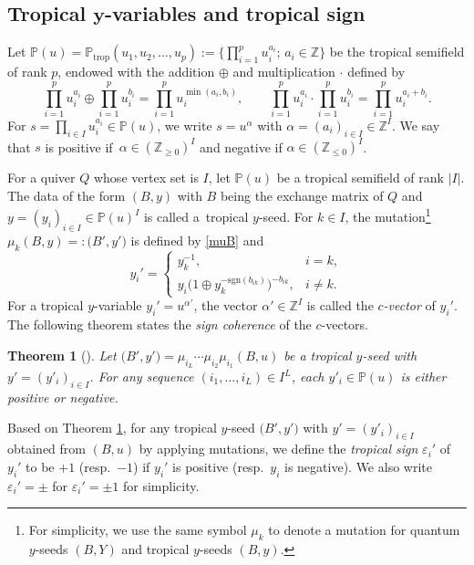 \documentclass[pdftex]{sigma}
\newcommand{\Z}{{\mathbb Z}}
\def\ve{{\varepsilon}}
\newcommand\trop{{\mathrm{trop}}}
\newcommand\bY{Y}
\numberwithin{equation}{section}
\newtheorem{Theorem}{Theorem}[section]
\begin{document}
\subsection[Tropical y-variables and tropical sign]{Tropical $\boldsymbol{y}$-variables and tropical sign}

Let $\mathbb{P}(u)=\mathbb{P}_\trop(u_1,u_2,\dotsc,u_p) := \bigl\{\prod_{i=1}^{p} u_i^{a_i};\, a_i \in \Z \bigr\}$
be the tropical semifield of rank $p$, endowed with the addition $\oplus$ and multiplication $\cdot$ defined by
\[
 \prod_{i=1}^{p} u_i^{a_i} \oplus \prod_{i=1}^{p} u_i^{b_i}
 =
 \prod_{i=1}^{p} u_i^{\min(a_i,b_i)},
 \qquad
 \prod_{i=1}^{p} u_i^{a_i} \cdot \prod_{i=1}^{p} u_i^{b_i}
 =
 \prod_{i=1}^{p} u_i^{a_i+b_i}.
\]
For $s = \prod_{i \in I} u_i^{a_i} \in \mathbb{P}(u)$, we write $s = u^\alpha$
with $\alpha = (a_i)_{i \in I} \in \Z^{I}$.
We say that $s$ is positive if~${\alpha \in (\Z_{\geq 0})^{I}}$ and negative if
$\alpha \in (\Z_{\leq 0})^{I}$.

For a quiver $Q$ whose vertex set is $I$, let $\mathbb{P}(u)$ be a tropical semifield of rank $|I|$.
The data of the form $(B,y)$ with $B$ being the exchange matrix of $Q$ and
$y = (y_i)_{i \in I} \in \mathbb{P}(u)^{I}$ is called a~tropical $y$-seed.
For $k \in I$, the mutation\footnote{For simplicity, we use the same symbol $\mu_k$ to denote a mutation for
quantum $y$-seeds $(B,\bY)$ and tropical $y$-seeds $(B,y)$.}
 $\mu_k (B, y) =: \bigl(B', y'\bigr)$ is defined by
\eqref{muB} and
\begin{equation}\label{tmu}
y_{i}' =
 \begin{cases}
 y_k^{-1}, & i=k,
 \\
 y_i \bigl(1 \oplus y_k^{-\mathrm{sgn}(b_{ik})}\bigr)^{-b_{ik}}, & i \neq k.
 \end{cases}
\end{equation}
For a tropical $y$-variable $y_i' = u^{\alpha'}$, the vector $\alpha' \in \Z^I$
is called the {\it $c$-vector} of $y_i'$.
The following theorem states the {\em sign coherence} of the $c$-vectors.

\begin{Theorem}[\cite{FZ07,GHKK14}]
\label{thm:sign-coherence}
Let $\bigl(B',y'\bigr) = \mu_{i_L} \dotsm \mu_{i_2} \mu_{i_1}(B,u)$ be a
tropical $y$-seed with $y'=(y'_i)_{i \in I}$. For any sequence
$(i_1,\dotsc, i_L) \in I^L$, each $y'_i \in \mathbb{P}(u)$ is either
positive or negative.
\end{Theorem}

Based on Theorem \ref{thm:sign-coherence}, for any tropical $y$-seed $\bigl(B',y'\bigr)$ with
$y'=(y'_i)_{i \in I}$ obtained from $(B,u)$ by applying mutations, we
define the {\it tropical sign} $\ve_i'$ of $y_i'$ to be $+1$ (resp.\
$-1$) if $y_i'$ is positive (resp.\ $y_i$ is negative). We also write
$\ve_i'= \pm$ for $\ve_i'=\pm 1$ for simplicity.
\end{document}
